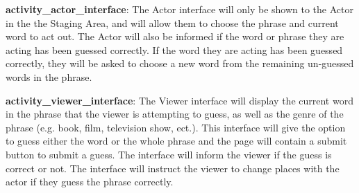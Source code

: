 \documentclass{article}
\begin{document}
\textbf{activity\_actor\_interface}: The Actor interface will only be shown to the Actor in the the Staging Area, and will allow them to choose the phrase and current word to act out. The Actor will also be informed if the word or phrase they are acting has been guessed correctly. If the word they are acting has been guessed correctly, they will be asked to choose a new word from the remaining un-guessed words in the phrase.

\textbf{activity\_viewer\_interface}: The Viewer interface will display the current word in the phrase that the viewer is attempting to guess, as well as the genre of the phrase (e.g. book, film, television show, ect.). This interface will give the option to guess either the word or the whole phrase and the page will contain a submit button to submit a guess. The interface will inform the viewer if the guess is correct or not. The interface will instruct the viewer to change places with the actor if they guess the phrase correctly.
\end{document}
